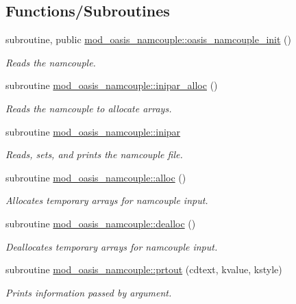 \subsection*{Functions/\+Subroutines}
\begin{DoxyCompactItemize}
\item 
subroutine, public \hyperlink{namespacemod__oasis__namcouple_ab57c69ae534734f92a85e24a3389e972}{mod\+\_\+oasis\+\_\+namcouple\+::oasis\+\_\+namcouple\+\_\+init} ()
\begin{DoxyCompactList}\small\item\em Reads the namcouple. \end{DoxyCompactList}\item 
subroutine \hyperlink{namespacemod__oasis__namcouple_acb43892c17b5f8c8b360effb5a811c27}{mod\+\_\+oasis\+\_\+namcouple\+::inipar\+\_\+alloc} ()
\begin{DoxyCompactList}\small\item\em Reads the namcouple to allocate arrays. \end{DoxyCompactList}\item 
subroutine \hyperlink{namespacemod__oasis__namcouple_a6da9d2285766ceb22ea8449f55201d84}{mod\+\_\+oasis\+\_\+namcouple\+::inipar}
\begin{DoxyCompactList}\small\item\em Reads, sets, and prints the namcouple file. \end{DoxyCompactList}\item 
subroutine \hyperlink{namespacemod__oasis__namcouple_a0d85a5dcb3fab17a680cceed332b9668}{mod\+\_\+oasis\+\_\+namcouple\+::alloc} ()
\begin{DoxyCompactList}\small\item\em Allocates temporary arrays for namcouple input. \end{DoxyCompactList}\item 
subroutine \hyperlink{namespacemod__oasis__namcouple_abf09a0e902f44f77874a75bb4a7fba33}{mod\+\_\+oasis\+\_\+namcouple\+::dealloc} ()
\begin{DoxyCompactList}\small\item\em Deallocates temporary arrays for namcouple input. \end{DoxyCompactList}\item 
subroutine \hyperlink{namespacemod__oasis__namcouple_aee06276b65463fb85340dcc2ab9d67dc}{mod\+\_\+oasis\+\_\+namcouple\+::prtout} (cdtext, kvalue, kstyle)
\begin{DoxyCompactList}\small\item\em Prints information passed by argument. \end{DoxyCompactList}\item 

\end{DoxyCompactItemize}
